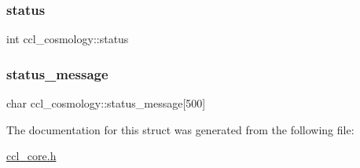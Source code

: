 \subsubsection{\texorpdfstring{status}{status}}
{\footnotesize\ttfamily int ccl\+\_\+cosmology\+::status}

\mbox{\label{structccl__cosmology_ade6f0b525e23bd7c719a46fe0e083a5e}} 
\subsubsection{\texorpdfstring{status\+\_\+message}{status\_message}}
{\footnotesize\ttfamily char ccl\+\_\+cosmology\+::status\+\_\+message\mbox{[}500\mbox{]}}



The documentation for this struct was generated from the following file\+:\begin{DoxyCompactItemize}
\item 
\mbox{\hyperlink{ccl__core_8h}{ccl\+\_\+core.\+h}}\end{DoxyCompactItemize}
